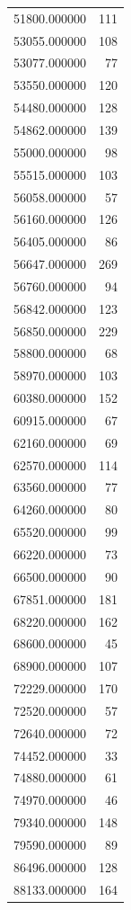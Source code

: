 \begin{tabular}{lr}
51800.000000  &   111 \\
53055.000000  &   108 \\
53077.000000  &    77 \\
53550.000000  &   120 \\
54480.000000  &   128 \\
54862.000000  &   139 \\
55000.000000  &    98 \\
55515.000000  &   103 \\
56058.000000  &    57 \\
56160.000000  &   126 \\
56405.000000  &    86 \\
56647.000000  &   269 \\
56760.000000  &    94 \\
56842.000000  &   123 \\
56850.000000  &   229 \\
58800.000000  &    68 \\
58970.000000  &   103 \\
60380.000000  &   152 \\
60915.000000  &    67 \\
62160.000000  &    69 \\
62570.000000  &   114 \\
63560.000000  &    77 \\
64260.000000  &    80 \\
65520.000000  &    99 \\
66220.000000  &    73 \\
66500.000000  &    90 \\
67851.000000  &   181 \\
68220.000000  &   162 \\
68600.000000  &    45 \\
68900.000000  &   107 \\
72229.000000  &   170 \\
72520.000000  &    57 \\
72640.000000  &    72 \\
74452.000000  &    33 \\
74880.000000  &    61 \\
74970.000000  &    46 \\
79340.000000  &   148 \\
79590.000000  &    89 \\
86496.000000  &   128 \\
88133.000000  &   164 \\

\end{tabular}
